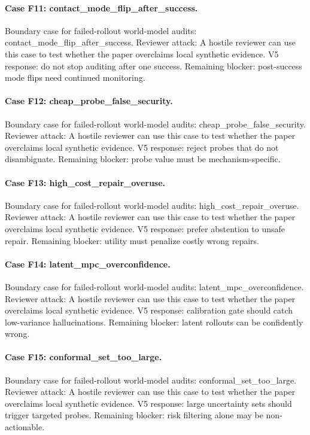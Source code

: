 \documentclass{article}
\begin{document}
\paragraph{Case F11: contact\_mode\_flip\_after\_success.} Boundary case for failed-rollout world-model audits: contact\_mode\_flip\_after\_success. Reviewer attack: A hostile reviewer can use this case to test whether the paper overclaims local synthetic evidence. V5 response: do not stop auditing after one success. Remaining blocker: post-success mode flips need continued monitoring.
\paragraph{Case F12: cheap\_probe\_false\_security.} Boundary case for failed-rollout world-model audits: cheap\_probe\_false\_security. Reviewer attack: A hostile reviewer can use this case to test whether the paper overclaims local synthetic evidence. V5 response: reject probes that do not disambiguate. Remaining blocker: probe value must be mechanism-specific.
\paragraph{Case F13: high\_cost\_repair\_overuse.} Boundary case for failed-rollout world-model audits: high\_cost\_repair\_overuse. Reviewer attack: A hostile reviewer can use this case to test whether the paper overclaims local synthetic evidence. V5 response: prefer abstention to unsafe repair. Remaining blocker: utility must penalize costly wrong repairs.
\paragraph{Case F14: latent\_mpc\_overconfidence.} Boundary case for failed-rollout world-model audits: latent\_mpc\_overconfidence. Reviewer attack: A hostile reviewer can use this case to test whether the paper overclaims local synthetic evidence. V5 response: calibration gate should catch low-variance hallucinations. Remaining blocker: latent rollouts can be confidently wrong.
\paragraph{Case F15: conformal\_set\_too\_large.} Boundary case for failed-rollout world-model audits: conformal\_set\_too\_large. Reviewer attack: A hostile reviewer can use this case to test whether the paper overclaims local synthetic evidence. V5 response: large uncertainty sets should trigger targeted probes. Remaining blocker: risk filtering alone may be non-actionable.
\end{document}
